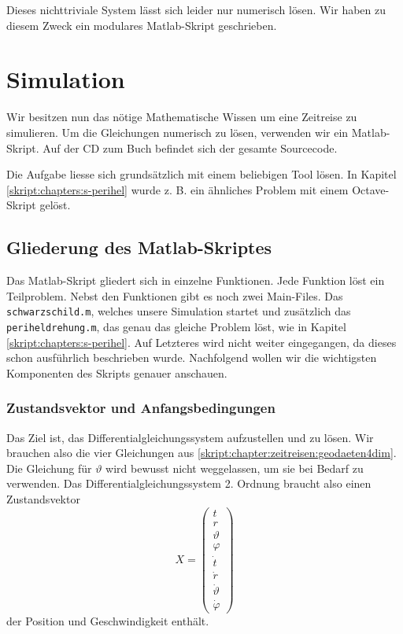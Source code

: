 \begin{refsection}
	Dieses nichttriviale System lässt sich leider nur numerisch lösen. Wir haben zu diesem Zweck ein modulares Matlab-Skript geschrieben. 
		
	\section{Simulation}\label{skript:chapter:zeitreisen:simulation}
    
    Wir besitzen nun das nötige Mathematische Wissen um eine Zeitreise zu simulieren. Um die Gleichungen numerisch zu lösen, verwenden wir ein Matlab-Skript. Auf der CD zum Buch befindet sich der gesamte Sourcecode. 
    
    Die Aufgabe liesse sich grundsätzlich mit einem beliebigen Tool lösen. In Kapitel \ref{skript:chapters:s-perihel} wurde z. B. ein ähnliches Problem mit einem Octave-Skript gelöst. 

    \subsection{Gliederung des Matlab-Skriptes}
    Das Matlab-Skript gliedert sich in einzelne Funktionen. Jede Funktion löst ein Teilproblem. Nebst den Funktionen gibt es noch zwei Main-Files. Das \texttt{schwarzschild.m}, welches unsere Simulation startet und zusätzlich das \texttt{periheldrehung.m}, das genau das gleiche Problem löst, wie in Kapitel \ref{skript:chapters:s-perihel}. Auf Letzteres wird nicht weiter eingegangen, da dieses schon ausführlich beschrieben wurde.
    Nachfolgend wollen wir die wichtigsten Komponenten des Skripts genauer anschauen.

    \subsubsection{Zustandsvektor und Anfangsbedingungen}
    Das Ziel ist, das Differentialgleichungssystem aufzustellen und zu lösen. Wir brauchen also die vier Gleichungen aus \ref{skript:chapter:zeitreisen:geodaeten4dim}. Die Gleichung für $\vartheta$ wird bewusst nicht weggelassen, um sie bei Bedarf zu verwenden. 
    Das Differentialgleichungssystem 2. Ordnung braucht also einen Zustandsvektor
    \[
    X=\begin{pmatrix}
    t\\r\\\vartheta\\\varphi \\\dot t\\\dot r\\\dot \vartheta\\\dot\varphi
    \end{pmatrix}
    \]
    der Position und Geschwindigkeit enthält.
    

\end{refsection}

